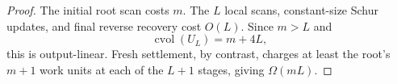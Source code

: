 \begin{proof}
The initial root scan costs $m$.  The $L$ local scans, constant-size Schur
updates, and final reverse recovery cost $O(L)$.  Since $m>L$ and
\begin{equation*}
 \operatorname{cvol}(U_L)=m+4L,
\end{equation*}
this is output-linear.  Fresh settlement, by contrast, charges at least the
root's $m+1$ work units at each of the $L+1$ stages, giving
$\Omega(mL)$.
\end{proof}
